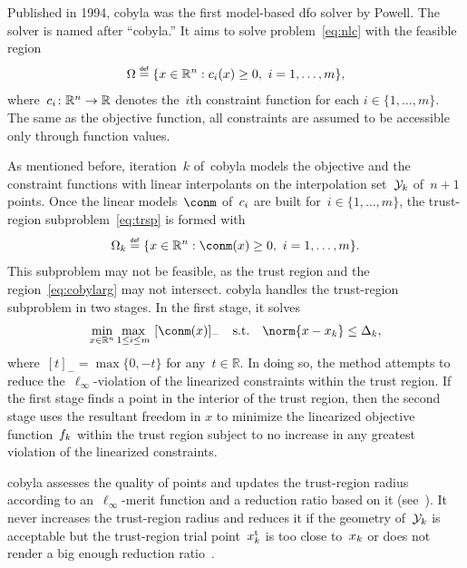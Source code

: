 \documentclass{article}
\numberwithin{equation}{section}
\theoremstyle{definition}
\theoremstyle{plain}
\theoremstyle{remark}
\newcommand*{\R}{\mathbb{R}}
\newcommand*{\set}[2][]{#1\{#2#1\}}
\newcommand{\st}{\text{s.t.}}
\newcommand{\trust}{{\text{t}}}
\newcommand{\con}[1][i]{c\ifthenelse{\equal{#1}{}}{}{_{#1}}}
\newcommand{\eqdef}{\stackrel{\mathsmaller{\mathsf{def}}}{=}}
\newcommand{\fsetm}[1][k]{\Omega_{#1}}
\newcommand{\fset}{\Omega}
\newcommand{\iter}[1][k]{x\ifthenelse{\equal{#1}{}}{}{_{#1}}}
\newcommand{\objm}[1][k]{\obj\ifthenelse{\equal{#1}{}}{}{_{#1}}}
\newcommand{\obj}{f}
\newcommand{\rad}[1][k]{\Delta\ifthenelse{\equal{#1}{}}{}{_{#1}}}
\newcommand{\xpt}[1][k]{\mathcal{Y}\ifthenelse{\equal{#1}{}}{}{_{#1}}}
\begin{document}
Published in 1994, \gls{cobyla} was the first model-based \gls{dfo} solver by Powell.
The solver is named after ``\glsdesc{cobyla}.''
It aims to solve problem~\eqref{eq:nlc} with the feasible region
\begin{equation*}
    \fset \eqdef \set{x \in \R^n : \con(x) \ge 0, ~ i = 1, \dots, m},
\end{equation*}
where~$\con \colon \R^n \to \R$ denotes the~$i$th constraint function for each $i \in \set{1, \dots, m}$.
The same as the objective function, all constraints are assumed to be accessible only through function values.

As mentioned before, iteration~$k$ of~\gls{cobyla} models the objective and the constraint functions with linear interpolants on the interpolation set~$\xpt$ of~$n + 1$ points.
Once the linear models~$\conm$ of~$\con$ are built for~$i \in \set{1, \dots, m}$, the trust-region subproblem~\eqref{eq:trsp} is formed with
\begin{equation}
    \label{eq:cobylarg}
    \fsetm \eqdef \set{x \in \R^n : \conm(x) \ge 0, ~ i=1, \dots, m}.
\end{equation}
This subproblem may not be feasible, as the trust region and the region~\eqref{eq:cobylarg} may not intersect.
\Gls{cobyla} handles the trust-region subproblem in two stages.
In the first stage, it solves
\begin{equation*}
    \min_{x \in \R^n} \max_{1 \le i \le m} ~ [\conm(x)]_{-} \quad \st \quad \norm{x - \iter} \le \rad,
\end{equation*}
where~$[t]_{-} = \max \set{0, -t}$ for any~$t\in \R$.
In doing so, the method attempts to reduce the~$\ell_{\infty}$-violation of the linearized constraints within the trust region.
If the first stage finds a point in the interior of the trust region, then the second stage uses the resultant freedom in $x$ to minimize the linearized objective function~$\objm$ within the trust region subject to no increase in any greatest violation of the linearized constraints.

\Gls{cobyla} assesses the quality of points and updates the trust-region radius according to an~$\ell_\infty$-merit function and a reduction ratio based on it (see~\cite[Equations~(5),~(9), and~(10)]{Powell_1994}).
It never increases the trust-region radius and reduces it if the geometry of~$\xpt$ is acceptable but the trust-region trial point~$\iter^\trust$ is too close to~$\iter$ or does not render a big enough reduction ratio~\cite[Equation~(11)]{Powell_1994}.
\end{document}
